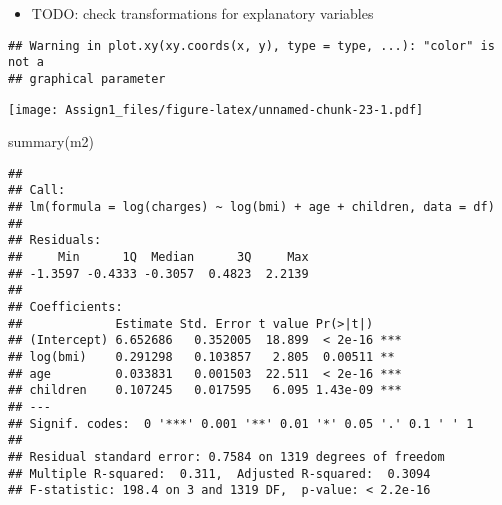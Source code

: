 \documentclass[
]{article}
\newenvironment{Shaded}{\begin{snugshade}}{\end{snugshade}}
\newcommand{\AttributeTok}[1]{\textcolor[rgb]{0.77,0.63,0.00}{#1}}
\newcommand{\CommentTok}[1]{\textcolor[rgb]{0.56,0.35,0.01}{\textit{#1}}}
\newcommand{\DecValTok}[1]{\textcolor[rgb]{0.00,0.00,0.81}{#1}}
\newcommand{\FunctionTok}[1]{\textcolor[rgb]{0.00,0.00,0.00}{#1}}
\newcommand{\NormalTok}[1]{#1}
\newcommand{\OtherTok}[1]{\textcolor[rgb]{0.56,0.35,0.01}{#1}}
\newcommand{\SpecialCharTok}[1]{\textcolor[rgb]{0.00,0.00,0.00}{#1}}
\newcommand{\StringTok}[1]{\textcolor[rgb]{0.31,0.60,0.02}{#1}}
\providecommand{\tightlist}{%
  \setlength{\itemsep}{0pt}\setlength{\parskip}{0pt}}
\begin{document}
\begin{itemize}
\tightlist
\item
  TODO: check transformations for explanatory variables
\end{itemize}

\begin{Shaded}
\end{Shaded}

\begin{verbatim}
## Warning in plot.xy(xy.coords(x, y), type = type, ...): "color" is not a
## graphical parameter
\end{verbatim}

\texttt{[image: Assign1\_files/figure-latex/unnamed-chunk-23-1.pdf]}

\begin{Shaded}
\begin{Highlighting}[]
\FunctionTok{summary}\NormalTok{(m2)}
\end{Highlighting}
\end{Shaded}

\begin{verbatim}
## 
## Call:
## lm(formula = log(charges) ~ log(bmi) + age + children, data = df)
## 
## Residuals:
##     Min      1Q  Median      3Q     Max 
## -1.3597 -0.4333 -0.3057  0.4823  2.2139 
## 
## Coefficients:
##             Estimate Std. Error t value Pr(>|t|)    
## (Intercept) 6.652686   0.352005  18.899  < 2e-16 ***
## log(bmi)    0.291298   0.103857   2.805  0.00511 ** 
## age         0.033831   0.001503  22.511  < 2e-16 ***
## children    0.107245   0.017595   6.095 1.43e-09 ***
## ---
## Signif. codes:  0 '***' 0.001 '**' 0.01 '*' 0.05 '.' 0.1 ' ' 1
## 
## Residual standard error: 0.7584 on 1319 degrees of freedom
## Multiple R-squared:  0.311,  Adjusted R-squared:  0.3094 
## F-statistic: 198.4 on 3 and 1319 DF,  p-value: < 2.2e-16
\end{verbatim}
\end{document}

